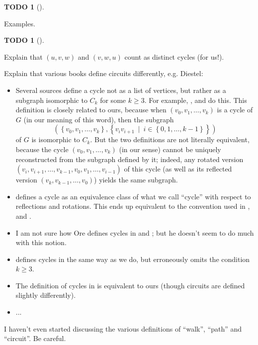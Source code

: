 \documentclass[numbers=enddot,12pt,final,onecolumn,notitlepage]{scrartcl}%
\theoremstyle{definition}
\newtheorem{quest}[theo]{TODO}
\newenvironment{todo}[1][]
{\begin{quest}[#1]\begin{leftbar}}
{\end{leftbar}\end{quest}}
\newcommand{\set}[1]{\left\{ #1 \right\}}
\newcommand{\tup}[1]{\left( #1 \right)}
\begin{document}
\begin{todo}
Examples.
\end{todo}

\begin{todo}
Explain that $\tup{u,v,w}$ and $\tup{v,w,u}$ count as distinct cycles
(for us!).

Explain that various books define circuits differently, e.g. Diestel:
\begin{itemize}
\item Several sources define a cycle not as a list of vertices,
      but rather as a subgraph isomorphic to $C_k$ for some
      $k \geq 3$. For example, \cite{Dieste16}, \cite{BonMur08} and
      \cite{West01} do this. This definition is closely related to
      ours, because when $\tup{v_0, v_1, \ldots, v_k}$ is a cycle of
      $G$ (in our meaning of this word), then the subgraph
      \[
      \tup{ \set{v_0, v_1, \ldots, v_k} ,
            \set{v_i v_{i+1} \ \mid \  i \in \set{0, 1, \ldots, k-1}}
          }
      \]
      of $G$ is isomorphic to $C_k$. But the two definitions are not
      literally equivalent, because the cycle
      $\tup{v_0, v_1, \ldots, v_k}$ (in our sense) cannot be uniquely
      reconstructed from the subgraph defined by it; indeed, any
      rotated version $\tup{v_i, v_{i+1}, \ldots, v_{k-1}, v_0, v_1,
      \ldots, v_{i-1}}$ of this cycle (as well as its reflected
      version $\tup{v_k, v_{k-1}, \ldots, v_0}$) yields the same
      subgraph.
\item \cite{Boll98} defines a cycle as an equivalence class of what
      we call ``cycle'' with respect to reflections and rotations.
      This ends up equivalent to the convention used in
      \cite{Dieste16}, \cite{BonMur08} and \cite{West01}.
\item I am not sure how Ore defines cycles in \cite{Ore90} and
      \cite{Ore74}; but he doesn't seem to do much with this notion.
\item \cite{Harju14} defines cycles in the same way as we do, but
      erroneously omits the condition $k \geq 3$.
\item The definition of cycles in \cite{BehCha71} is equivalent to
      ours (though circuits are defined slightly differently).
\item ...
\end{itemize}
I haven't even started discussing the various definitions of ``walk'',
``path'' and ``circuit''. Be careful.
\end{todo}

\end{document}
